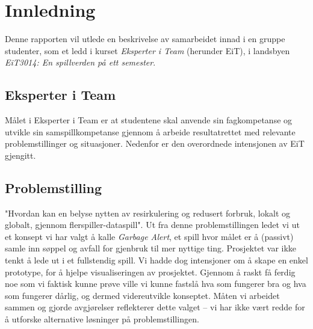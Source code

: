 \section{Innledning}
Denne rapporten vil utlede en beskrivelse av samarbeidet innad i en gruppe studenter, som et ledd i kurset \emph{Eksperter i Team} (herunder EiT), i landsbyen \emph{EiT3014: En spillverden på ett semester}.

	\subsection{Eksperter i Team}
	Målet i Eksperter i Team er at studentene skal anvende sin fagkompetanse og utvikle sin samspillkompetanse gjennom å arbeide resultatrettet med relevante problemstillinger og situasjoner. Nedenfor er den overordnede intensjonen av EiT gjengitt.


	\subsection{Problemstilling}
	"Hvordan kan en belyse nytten av resirkulering og redusert forbruk, lokalt og globalt, gjennom flerspiller-dataspill". Ut fra denne problemstillingen ledet vi ut et konsept vi har valgt å kalle \emph{Garbage Alert}, et spill hvor målet er å (passivt) samle inn søppel og avfall for gjenbruk til mer nyttige ting. Prosjektet var ikke tenkt å lede ut i et fullstendig spill. Vi hadde dog intensjoner om å skape en enkel prototype, for å hjelpe visualiseringen av prosjektet. Gjennom å raskt få ferdig noe som vi faktisk kunne prøve ville vi kunne fastslå hva som fungerer bra og hva som fungerer dårlig, og dermed videreutvikle konseptet. Måten vi arbeidet sammen og gjorde avgjørelser reflekterer dette valget – vi har ikke vært redde for å utforske alternative løsninger på problemstillingen.


